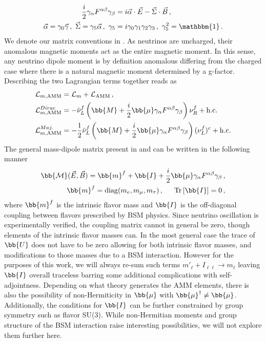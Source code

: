 \begin{alignat}{1}
	\label{mass:eq:04c} \frac{i}{2}\gamma_{\alpha}F^{\alpha\beta}\gamma_{\beta} &= i\vec{\alpha}\cdot\vec{E}-\vec{\Sigma}\cdot\vec{B}\,,\\
	\label{mass:eq:04d} \vec{\alpha} = \gamma_{0}\vec{\gamma}\,,\ \vec{\Sigma}=\gamma_{5}\vec{\alpha}\,,\ \gamma_{5}&=i\gamma_{0}\gamma_{1}\gamma_{2}\gamma_{3}\,,\ \gamma_{5}^{2}=\mathbbm{1}\,.
\end{alignat}
We denote our matrix conventions in . As neutrinos are uncharged, their anomalous magnetic moments act as the entire magnetic moment. In this sense, any neutrino dipole moment is by definition anomalous differing from the charged case where there is a natural magnetic moment determined by a g-factor. Describing the two Lagrangian terms together reads as
\begin{alignat}{1}
	\label{mass:eq:05a} \mathcal{L}_{m,\mathrm{AMM}} &= \mathcal{L}_{m} + \mathcal{L}_{\mathrm{AMM}}\,,\\
	\label{mass:eq:05b} \mathcal{L}_{m,\mathrm{AMM}}^{Dirac} &= -\bar{\nu}^{f}_{L}\left(\bb{M} + \frac{i}{2}\bb{\mu}\gamma_{\alpha}F^{\alpha\beta}\gamma_{\beta}\right)\nu^{f}_{R}+\mathrm{h.c.}\\
	\label{mass:eq:05c} \mathcal{L}_{m,\mathrm{AMM}}^{Maj.} &= -\frac{1}{2}\bar{\nu}^{f}_{L}\left(\bb{M} + \frac{i}{2}\bb{\mu}\gamma_{\alpha}F^{\alpha\beta}\gamma_{\beta}\right)(\nu^{f}_{L})^{c}+\mathrm{h.c.}
\end{alignat}
The general mass-dipole matrix present in  and  can be written in the following manner
\begin{alignat}{1}
	\label{mass:eq:06a} {\bb{\mathcal{M}}}(\vec{E},\vec{B}) = \bb{m}^{f} + \bb{I} + \frac{i}{2}\bb{\mu}\gamma_{\alpha}F^{\alpha\beta}\gamma_{\beta}\,,\\
	\label{mass:eq:06b} \bb{m}^{f} = \mathrm{diag}(m_{e},m_{\mu},m_{\tau})\,,\indent\mathrm{Tr}\left[\bb{I}\right] = 0 \,,
\end{alignat}
where $\bb{m}^{f}$ is the intrinsic flavor mass and $\bb{I}$ is the off-diagonal coupling between flavors prescribed by BSM physics. Since neutrino oscillation is experimentally verified, the coupling matrix cannot in general be zero, though elements of the intrinsic flavor masses can. In the most general case the trace of $\bb{U}$ does not have to be zero allowing for both intrinsic flavor masses, and modifications to those masses due to a BSM interaction. However for the purposes of this work, we will always re-sum such terms $m'_{\ell}+I_{\ell\ell}\rightarrow m_{\ell}$ leaving $\bb{I}$ overall traceless barring some additional complications with self-adjointness. Depending on what theory generates the AMM elements, there is also the possibility of non-Hermiticity in $\bb{\mu}$ with $\bb{\mu}^{\dagger}\neq\bb{\mu}$. Additionally, the conditions for $\bb{I}$ can be further constrained by group symmetry such as flavor SU(3). While non-Hermitian moments and group structure of the BSM interaction raise interesting possibilities, we will not explore them further here. 

